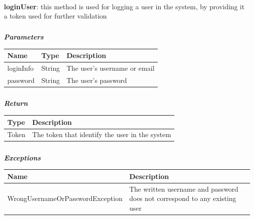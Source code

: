 					\paragraph{}
							\textbf{loginUser}: this method is used for logging a user in the system, by providing it a token used for further validation
							\subparagraph{}
							\vspace{-3mm}
							\textit{\textbf{Parameters}}
							\vspace{-2mm}
								\begin{table}[!h]
									\begin{tabular}{L{0.2\textwidth}L{0.15\textwidth}L{0.45\textwidth}}
										\toprule
										\textbf{Name} & \textbf{Type} & \textbf{Description} \\
										\midrule
								  		loginInfo & String & The user's username or email \\
								  		password & String & The user's password \\
								 		\bottomrule
									\end{tabular}
								\end{table}
							\subparagraph{}
							\vspace{-6mm}
								\textit{\textbf{Return}}
								\vspace{-2mm}
									\begin{table}[!h]
									\begin{tabular}{L{0.15\textwidth}L{0.65\textwidth}}
										\toprule
										\textbf{Type} & \textbf{Description} \\
										\midrule
								  		Token & The token that identify the user in the system \\
								  		\bottomrule
									\end{tabular}
								\end{table}
							\subparagraph{}
							\vspace{-6mm}
								\textit{\textbf{Exceptions}}
								\vspace{-2mm}
									\begin{table}[!h]
									\begin{tabular}{L{0.5\textwidth}L{0.3\textwidth}}
										\toprule
										\textbf{Name} & \textbf{Description} \\
										\midrule
								  	WrongUsernameOrPasswordException & The written username and password does not correspond to any existing user \\
								 		\bottomrule
									\end{tabular}
								\end{table}
								
